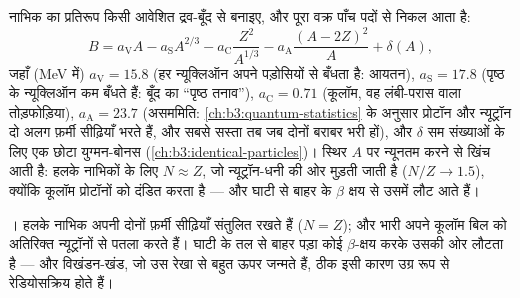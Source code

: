 \begin{proposition}[अर्ध-आनुभविक द्रव्यमान सूत्र]\label{prop:b3:nuclear-physics:semf}
नाभिक का प्रतिरूप किसी आवेशित द्रव-बूँद से बनाइए, और पूरा वक्र
पाँच पदों से निकल आता है:
\[
B = a_{\text{V}}A - a_{\text{S}}A^{2/3}
- a_{\text{C}}\frac{Z^2}{A^{1/3}}
- a_{\text{A}}\frac{(A - 2Z)^2}{A} + \delta(A) ,
\]
जहाँ (\unit{MeV} में) $a_{\text{V}} = 15.8$ (हर न्यूक्लिऑन अपने
पड़ोसियों से बँधता है: आयतन), $a_{\text{S}} = 17.8$ (पृष्ठ के
न्यूक्लिऑन कम बँधते हैं: बूँद का ``पृष्ठ तनाव''), $a_{\text{C}} = 0.71$
(कूलॉम, वह लंबी-परास वाला तोड़फोड़िया), $a_{\text{A}} = 23.7$
(असममिति: \cref{ch:b3:quantum-statistics} के अनुसार प्रोटॉन और
न्यूट्रॉन दो अलग फ़र्मी सीढ़ियाँ भरते हैं, और सबसे सस्ता तब जब दोनों
बराबर भरी हों), और $\delta$ सम संख्याओं के लिए एक छोटा युग्मन-बोनस
(\cref{ch:b3:identical-particles})। स्थिर $A$ पर न्यूनतम करने से
\emph{} खिंच आती है: हलके नाभिकों के लिए $N \approx Z$,
जो न्यूट्रॉन-धनी की ओर मुड़ती जाती है ($N/Z \to 1.5$), क्योंकि कूलॉम
प्रोटॉनों को दंडित करता है --- और घाटी से बाहर के 
$\beta$ क्षय से उसमें लौट आते हैं।
\end{proposition}
\admitted

\begin{omfigure}

{\small {}। हलके नाभिक अपनी दोनों
फ़र्मी सीढ़ियाँ संतुलित रखते हैं ($N = Z$); और भारी अपने कूलॉम बिल को
अतिरिक्त न्यूट्रॉनों से पतला करते हैं। घाटी के तल से बाहर पड़ा कोई
 $\beta$-क्षय करके उसकी ओर लौटता है --- और विखंडन-खंड, जो
उस रेखा से बहुत ऊपर जन्मते हैं, ठीक इसी कारण उग्र रूप से रेडियोसक्रिय
होते हैं।}
\end{omfigure}

